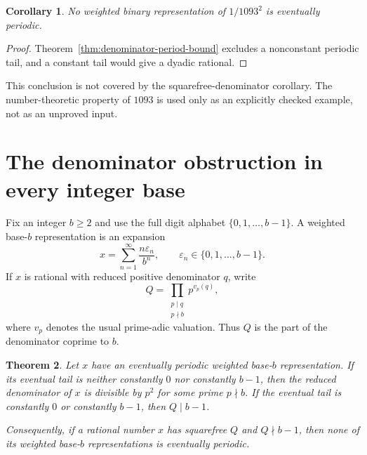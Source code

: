 \documentclass[11pt]{article}
\newtheorem{theorem}{Theorem}[section]
\newtheorem{corollary}[theorem]{Corollary}
\theoremstyle{definition}
\theoremstyle{remark}
\begin{document}
\begin{corollary}
No weighted binary representation of $1/1093^2$ is eventually periodic.
\end{corollary}
\begin{proof}
Theorem~\ref{thm:denominator-period-bound} excludes a nonconstant
periodic tail, and a constant tail would give a dyadic rational.
\end{proof}
This conclusion is not covered by the squarefree-denominator corollary.
The number-theoretic property of $1093$ is used only as an explicitly
checked example, not as an unproved input.


\section{The denominator obstruction in every integer base}
\label{sec:general-base}

Fix an integer $b\geq 2$ and use the full digit alphabet
$\{0,1,\ldots,b-1\}$.  A weighted base-$b$ representation is an expansion
\[
 x=\sum_{n=1}^{\infty}\frac{n\varepsilon_n}{b^n},
 \qquad \varepsilon_n\in\{0,1,\ldots,b-1\}.
\]
If $x$ is rational with reduced positive denominator $q$, write
\[
 Q=\prod_{\substack{p\mid q\\p\nmid b}}p^{v_p(q)},
\]
where $v_p$ denotes the usual prime-adic valuation.  Thus $Q$ is the part
of the denominator coprime to $b$.

\begin{theorem}\label{thm:general-base-obstruction}
Let $x$ have an eventually periodic weighted base-$b$ representation.
If its eventual tail is neither constantly $0$ nor constantly $b-1$,
then the reduced denominator of $x$ is divisible by $p^2$ for some prime
$p\nmid b$.  If the eventual tail is constantly $0$ or constantly $b-1$,
then $Q\mid b-1$.

Consequently, if a rational number $x$ has squarefree $Q$ and
$Q\nmid b-1$, then none of its weighted base-$b$ representations is
eventually periodic.
\end{theorem}
\end{document}
